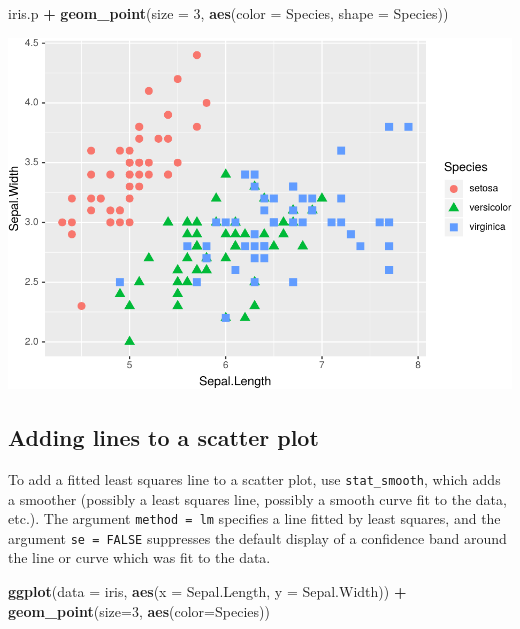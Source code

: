 \documentclass[]{krantz}
\makeatletter
\newenvironment{Shaded}{\begin{snugshade}}{\end{snugshade}}
\newcommand{\DataTypeTok}[1]{\textcolor[rgb]{0.27,0.27,0.27}{#1}}
\newcommand{\DecValTok}[1]{\textcolor[rgb]{0.06,0.06,0.06}{#1}}
\newcommand{\KeywordTok}[1]{\textcolor[rgb]{0.27,0.27,0.27}{\textbf{#1}}}
\newcommand{\NormalTok}[1]{#1}
\newcommand{\OperatorTok}[1]{\textcolor[rgb]{0.43,0.43,0.43}{\textbf{#1}}}
\newcommand{\StringTok}[1]{\textcolor[rgb]{0.5,0.5,0.5}{#1}}
\newenvironment{kframe}{%
\medskip{}
\setlength{\fboxsep}{.8em}
 \def\at@end@of@kframe{}%
 \ifinner\ifhmode%
  \def\at@end@of@kframe{\end{minipage}}%
  \begin{minipage}{\columnwidth}%
 \fi\fi%
 \def\FrameCommand##1{\hskip\@totalleftmargin \hskip-\fboxsep
 \colorbox{shadecolor}{##1}\hskip-\fboxsep
     \hskip-\linewidth \hskip-\@totalleftmargin \hskip\columnwidth}%
 \MakeFramed {\advance\hsize-\width
   \@totalleftmargin\z@ \linewidth\hsize
   \@setminipage}}%
 {\par\unskip\endMakeFramed%
 \at@end@of@kframe}
\renewenvironment{Shaded}{\begin{kframe}}{\end{kframe}}
\makeatother
\begin{document}
\begin{Shaded}
\begin{Highlighting}[]
\NormalTok{iris.p }\OperatorTok{+}\StringTok{ }\KeywordTok{geom_point}\NormalTok{(}\DataTypeTok{size =} \DecValTok{3}\NormalTok{, }\KeywordTok{aes}\NormalTok{(}\DataTypeTok{color =}\NormalTok{ Species, }\DataTypeTok{shape =}\NormalTok{ Species))}
\end{Highlighting}
\end{Shaded}

\includegraphics{bookdown_files/figure-latex/unnamed-chunk-61-2.pdf}

\hypertarget{adding-lines-to-a-scatter-plot}{%
\subsection{Adding lines to a scatter plot}\label{adding-lines-to-a-scatter-plot}}

To add a fitted least squares line to a scatter plot, use \texttt{stat\_smooth}, which adds a smoother (possibly a least squares line, possibly a smooth curve fit to the data, etc.). The argument \texttt{method\ =\ lm} specifies a line fitted by least squares, and the argument \texttt{se\ =\ FALSE} suppresses the default display of a confidence band around the line or curve which was fit to the data.

\begin{Shaded}
\begin{Highlighting}[]
\KeywordTok{ggplot}\NormalTok{(}\DataTypeTok{data =}\NormalTok{ iris, }\KeywordTok{aes}\NormalTok{(}\DataTypeTok{x =}\NormalTok{ Sepal.Length, }\DataTypeTok{y =}\NormalTok{ Sepal.Width)) }\OperatorTok{+}\StringTok{ }
\StringTok{    }\KeywordTok{geom_point}\NormalTok{(}\DataTypeTok{size=}\DecValTok{3}\NormalTok{, }\KeywordTok{aes}\NormalTok{(}\DataTypeTok{color=}\NormalTok{Species))}
\end{Highlighting}
\end{Shaded}
\end{document}
